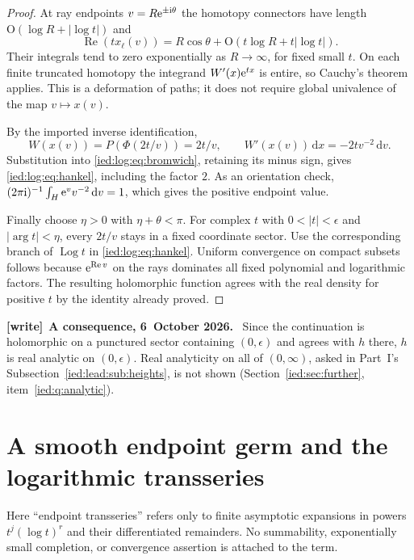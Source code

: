 \documentclass[11pt,letterpaper]{article}
\theoremstyle{remark}\newtheorem{remark}[theorem]{Remark}
\newcommand{\ii}{\mathrm i}\newcommand{\dd}{\,\mathrm d}
\newcommand{\Oh}{\mathrm O}\newcommand{\supp}{\operatorname{supp}}
\newcommand{\Rea}{\operatorname{Re}}\newcommand{\Ima}{\operatorname{Im}}
\newcommand{\Log}{\operatorname{Log}}
\newenvironment{writenote}[1][]{\par\smallskip\begingroup\small
 \noindent\textbf{[write]}\if\relax\detokenize{#1}\relax\else~\textbf{#1.}\fi\ }%
 {\par\endgroup\smallskip}
\begin{document}
\begin{proof}
At ray endpoints $v=R\e^{\pm\ii\theta}$ the homotopy connectors have length $\Oh(\log R+|\log t|)$ and
\[
 \Rea(t x_\ell(v))=R\cos\theta+\Oh(t\log R+t|\log t|).
\]
Their integrals tend to zero exponentially as $R\to\infty$, for fixed small $t$. On each finite truncated homotopy the integrand $W'(x)\mathrm e^{tx}$ is entire, so Cauchy's theorem applies. This is a deformation of paths; it does not require global univalence of the map $v\mapsto x(v)$.

By the imported inverse identification,
\[
 W(x(v))=P(\Phi(2t/v))=2t/v,
 \qquad W'(x(v))\dd x=-2t v^{-2}\dd v.
\]
Substitution into \eqref{ied:log:eq:bromwich}, retaining its minus sign, gives
\eqref{ied:log:eq:hankel}, including the factor $2$. As an orientation check,
$(2\pi\ii)^{-1}\int_H\e^vv^{-2}\dd v=1$, which gives the positive endpoint value.

Finally choose $\eta>0$ with $\eta+\theta<\pi$. For complex $t$ with
$0<|t|<\epsilon$ and $|\arg t|<\eta$, every $2t/v$ stays in a fixed coordinate sector. Use the corresponding branch of $\Log t$ in \eqref{ied:log:eq:hankel}. Uniform convergence on compact subsets follows because $\e^{\Rea v}$ on the rays dominates all fixed polynomial and logarithmic factors. The resulting holomorphic function agrees with the real density for positive $t$ by the identity already proved.
\end{proof}

\begin{writenote}[A consequence, 6~October 2026]
Since the continuation is holomorphic on a punctured sector containing $(0,\epsilon)$ and agrees with $h$ there, $h$ is real analytic on $(0,\epsilon)$. Real analyticity on all of $(0,\infty)$, asked in Part~I's Subsection~\ref{ied:lead:sub:heights}, is not shown (Section~\ref{ied:sec:further}, item~\ref{ied:q:analytic}).
\end{writenote}

\section{A smooth endpoint germ and the logarithmic transseries}\label{ied:log:sec:germ}
Here ``endpoint transseries'' refers only to finite asymptotic expansions in powers $t^j(\log t)^r$ and their differentiated remainders. No summability, exponentially small completion, or convergence assertion is attached to the term.
\end{document}
